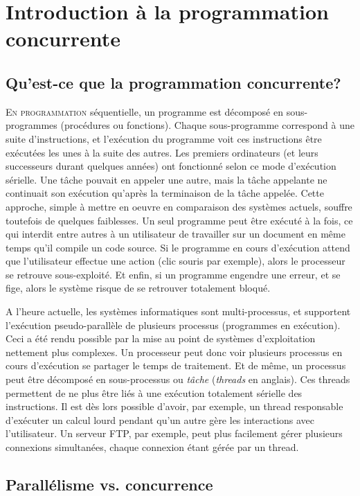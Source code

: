 \chapter{Introduction à la programmation concurrente}\label{sec:into}
\startchapter

\section{Qu'est-ce que la programmation concurrente?}


\lettrine[lines=4]{E}{n programmation} séquentielle, un programme est décomposé en sous-programmes (procédures ou fonctions). Chaque sous-programme correspond à une suite d'instructions, et l'exécution du programme voit ces instructions être exécutées les unes à la suite des autres. Les premiers ordinateurs (et leurs successeurs durant quelques années) ont fonctionné selon ce mode d'exécution sérielle. Une tâche pouvait en appeler une autre, mais la tâche appelante ne continuait son exécution qu'après la terminaison de la tâche appelée. Cette approche, simple à mettre en oeuvre en comparaison des systèmes actuels, souffre toutefois de quelques faiblesses. Un seul programme peut être exécuté à la fois, ce qui interdit entre autres à un utilisateur de travailler sur un document en même temps qu'il compile un code source. Si le programme en cours d'exécution attend que l'utilisateur effectue une action (clic souris par exemple), alors le processeur se retrouve sous-exploité. Et enfin, si un programme engendre une erreur, et se fige, alors le système risque de se retrouver totalement bloqué.

A l'heure actuelle, les systèmes informatiques sont multi-processus, et supportent l'exécution pseudo-parallèle de plusieurs processus (programmes en exécution). Ceci a été rendu possible par la mise au point de systèmes d'exploitation nettement plus complexes. Un processeur peut donc voir plusieurs processus en cours d'exécution se partager le temps de traitement. Et de même, un processus peut être décomposé en sous-processus ou \emph{tâche} (\emph{threads} en anglais). Ces threads permettent de ne plus être liés à une exécution totalement sérielle des instructions. Il est dès lors possible d'avoir, par exemple, un thread responsable d'exécuter un calcul lourd pendant qu'un autre gère les interactions avec l'utilisateur. Un serveur FTP, par exemple, peut plus facilement gérer plusieurs connexions simultanées, chaque connexion étant gérée par un thread.


\section{Parallélisme vs. concurrence}

